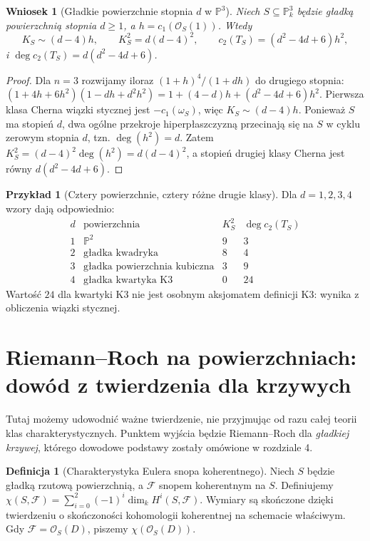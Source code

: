 \documentclass[11pt,a4paper,openany]{report}
\numberwithin{equation}{section}
\theoremstyle{plain}
\newtheorem{wniosek}[twierdzenie]{Wniosek}
\theoremstyle{definition}
\newtheorem{definicja}[twierdzenie]{Definicja}
\newtheorem{przyklad}[twierdzenie]{Przykład}
\theoremstyle{remark}
\newcommand{\PP}{\mathbb P}
\begin{document}
\begin{wniosek}[Gładkie powierzchnie stopnia $d$ w $\PP^3$]
\label{wn:ga7-degree-d-surface}
Niech $S\subseteq\PP^3_k$ będzie gładką powierzchnią
stopnia $d\ge1$, a $h=c_1(\mathcal O_S(1))$.
Wtedy
\[
 K_S\sim(d-4)h,\qquad K_S^2=d(d-4)^2,\qquad
 c_2(T_S)=(d^2-4d+6)h^2,
\]
i $\deg c_2(T_S)=d(d^2-4d+6)$.
\end{wniosek}
\begin{proof}
Dla $n=3$ rozwijamy iloraz
$(1+h)^4/(1+dh)$ do drugiego stopnia:
$(1+4h+6h^2)(1-dh+d^2h^2)
=1+(4-d)h+(d^2-4d+6)h^2$.
Pierwsza klasa Cherna wiązki stycznej jest
$-c_1(\omega_S)$, więc $K_S\sim(d-4)h$.
Ponieważ $S$ ma stopień $d$, dwa ogólne przekroje
hiperpłaszczyzną przecinają się na $S$ w cyklu zerowym
stopnia $d$, tzn. $\deg(h^2)=d$.
Zatem $K_S^2=(d-4)^2\deg(h^2)=d(d-4)^2$,
a stopień drugiej klasy Cherna jest równy
$d(d^2-4d+6)$.
\end{proof}

\begin{przyklad}[Cztery powierzchnie, cztery różne drugie klasy]
\label{prz:ga7-surface-invariants}
Dla $d=1,2,3,4$ wzory dają odpowiednio:
\[
\begin{array}{c|c|c|c}
 d & \text{powierzchnia} & K_S^2 & \deg c_2(T_S)\\ \hline
 1 & \PP^2 & 9 & 3\\
 2 & \text{gładka kwadryka} & 8 & 4\\
 3 & \text{gładka powierzchnia kubiczna} & 3 & 9\\
 4 & \text{gładka kwartyka K3} & 0 & 24
\end{array}
\]
Wartość $24$ dla kwartyki K3 nie jest osobnym aksjomatem
definicji K3: wynika z obliczenia wiązki stycznej.
\end{przyklad}

\section{Riemann--Roch na powierzchniach: dowód z twierdzenia dla krzywych}
\label{sec:ga7-rr-surface}

Tutaj możemy udowodnić ważne twierdzenie, nie przyjmując
od razu całej teorii klas charakterystycznych. Punktem wyjścia
będzie Riemann--Roch dla \emph{gładkiej krzywej}, którego
dowodowe podstawy zostały omówione w rozdziale 4.

\begin{definicja}[Charakterystyka Eulera snopa koherentnego]
\label{def:ga7-chi}
Niech $S$ będzie gładką rzutową powierzchnią, a
$\mathcal F$ snopem koherentnym na $S$. Definiujemy
$\chi(S,\mathcal F)=\sum_{i=0}^{2}(-1)^i
\dim_k H^i(S,\mathcal F)$.
Wymiary są skończone dzięki twierdzeniu o skończoności
kohomologii koherentnej na schemacie właściwym.
Gdy $\mathcal F=\mathcal O_S(D)$, piszemy
$\chi(\mathcal O_S(D))$.
\end{definicja}
\end{document}
